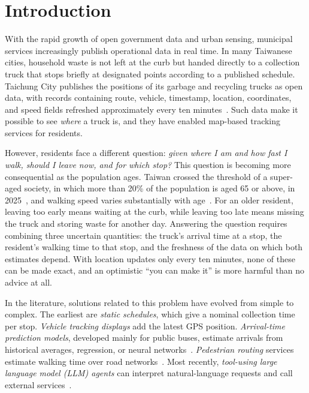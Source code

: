 \section{Introduction}\label{sec:intro}

With the rapid growth of open government data and urban sensing, municipal services increasingly publish operational data in real time. In many Taiwanese cities, household waste is not left at the curb but handed directly to a collection truck that stops briefly at designated points according to a published schedule. Taichung City publishes the positions of its garbage and recycling trucks as open data, with records containing route, vehicle, timestamp, location, coordinates, and speed fields refreshed approximately every ten minutes~\cite{taichung_fleet_api}. Such data make it possible to see \emph{where} a truck is, and they have enabled map-based tracking services for residents.

However, residents face a different question: \emph{given where I am and how fast I walk, should I leave now, and for which stop?} This question is becoming more consequential as the population ages. Taiwan crossed the threshold of a super-aged society, in which more than 20\% of the population is aged 65 or above, in 2025~\cite{ndc_population}, and walking speed varies substantially with age~\cite{knoblauch1996}. For an older resident, leaving too early means waiting at the curb, while leaving too late means missing the truck and storing waste for another day. Answering the question requires combining three uncertain quantities: the truck's arrival time at a stop, the resident's walking time to that stop, and the freshness of the data on which both estimates depend. With location updates only every ten minutes, none of these can be made exact, and an optimistic ``you can make it'' is more harmful than no advice at all.

In the literature, solutions related to this problem have evolved from simple to complex. The earliest are \emph{static schedules}, which give a nominal collection time per stop. \emph{Vehicle tracking displays} add the latest GPS position. \emph{Arrival-time prediction models}, developed mainly for public buses, estimate arrivals from historical averages, regression, or neural networks~\cite{chien2002,jeong2004}. \emph{Pedestrian routing} services estimate walking time over road networks~\cite{postgis}. Most recently, \emph{tool-using large language model (LLM) agents} can interpret natural-language requests and call external services~\cite{yao2023react,schick2023toolformer}.

